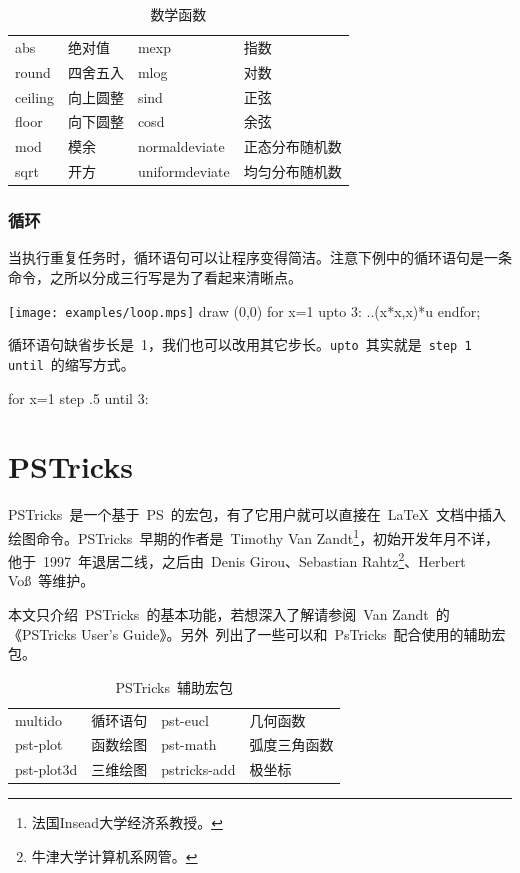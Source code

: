 \begin{table}[htbp]
\caption{数学函数}
\label{tab:math_function}
\centering
\begin{tabular}{llll}
    \toprule
    abs     & 绝对值   & mexp & 指数 \\
    round   & 四舍五入 & mlog & 对数 \\
    ceiling & 向上圆整 & sind & 正弦 \\
    floor   & 向下圆整 & cosd & 余弦 \\
    mod     & 模余     & normaldeviate & 正态分布随机数 \\
    sqrt    & 开方     & uniformdeviate & 均匀分布随机数 \\
    \bottomrule
\end{tabular}
\end{table}

\subsubsection{循环}
当执行重复任务时，循环语句可以让程序变得简洁。注意下例中的循环语句是一条命令，之所以分成三行写是为了看起来清晰点。

\begin{fdemo}{\texttt{[image: examples/loop.mps]}}
draw (0,0) %
for x=1 upto 3: 
    ..(x*x,x)*u 
endfor;
\end{fdemo}

循环语句缺省步长是~1，我们也可以改用其它步长。\verb|upto|~其实就是~\verb|step 1 until|~的缩写方式。
\begin{code}
for x=1 step .5 until 3: 
\end{code}

\section{PSTricks}
\label{sec:pstricks}

PSTricks~是一个基于~PS~的宏包，有了它用户就可以直接在~\LaTeX~文档中插入绘图命令。PSTricks~早期的作者是~Timothy Van Zandt\footnote{法国Insead大学经济系教授。}，初始开发年月不详，他于~1997~年退居二线，之后由~Denis Girou、Sebastian Rahtz\footnote{牛津大学计算机系网管。}、Herbert Voß~等维护。

本文只介绍~PSTricks~的基本功能，若想深入了解请参阅~Van Zandt~的《PSTricks User's Guide》\citep{Zandt_2007}。另外~列出了一些可以和~PsTricks~配合使用的辅助宏包。

\begin{table}[htbp]
\caption{PSTricks~辅助宏包}
\label{tab:pst_add}
\centering
\begin{tabular}{llll}
    \toprule
    multido & 循环语句    & pst-eucl & 几何函数 \\    
    pst-plot & 函数绘图   & pst-math & 弧度三角函数 \\
    pst-plot3d & 三维绘图 & pstricks-add & 极坐标 \\  
    \bottomrule
\end{tabular}
\end{table}

